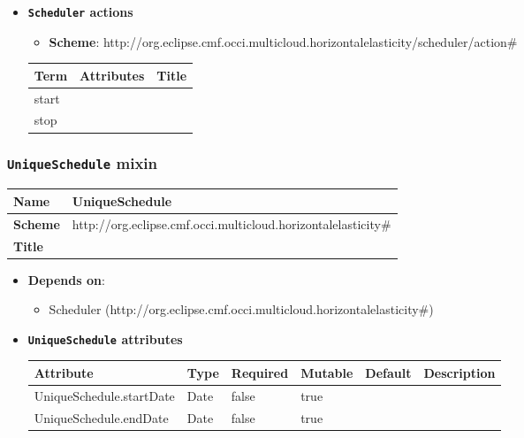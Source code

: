 \begin{itemize}
\item \textbf{\texttt{Scheduler} actions}

\begin{itemize}
	\item \textbf{Scheme}: http://org.eclipse.cmf.occi.multicloud.horizontalelasticity/scheduler/action\#
\end{itemize}

\begin{center}
\begin{tabular}{|l|l|l|}
  \hline
  \textbf{Term}  & \textbf{Attributes} & \textbf{Title} \\
  \hline  
  start & &  \\
  \hline
  stop & &  \\
  \hline
\end{tabular}
\end{center}
\end{itemize}

 
\subsubsection{\texttt{UniqueSchedule} mixin}
\begin{center}
\begin{tabular}{|l|l|}
  \hline
  \textbf{Name} & UniqueSchedule \\
  \hline  
  \textbf{Scheme} & http://org.eclipse.cmf.occi.multicloud.horizontalelasticity\# \\
  \hline
  \textbf{Title} &  \\
  \hline
\end{tabular}
\end{center}

\begin{itemize}
\item \textbf{Depends on}:
\begin{itemize}
	\item Scheduler (http://org.eclipse.cmf.occi.multicloud.horizontalelasticity\#)
\end{itemize}
\end{itemize}

\begin{itemize}
\item \textbf{\texttt{UniqueSchedule} attributes}

\begin{tabularx}{\textwidth}{|l|l|p{1.4cm}|p{1.3cm}|l|X|}
  \hline
  \textbf{Attribute} & \textbf{Type} & \textbf{Required} & \textbf{Mutable} & \textbf{Default} & \textbf{Description} \\
  \hline  
  UniqueSchedule.startDate & Date & false & true &  &  \\
  \hline
  UniqueSchedule.endDate & Date & false & true &  &  \\
  \hline
\end{tabularx}
\end{itemize}


